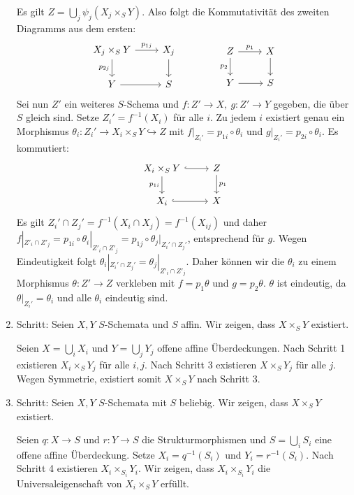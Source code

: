 \documentclass[11pt,b5paper,openany]{memoir}
\begin{document}
\begin{enumerate}
Es gilt $Z=\bigcup_j\psi_j(X_j\times_SY)$. Also folgt die Kommutativität des zweiten Diagramms aus dem ersten:
\[\begin{tikzcd}
X_j\times_S Y\ar[r, "p_{1j}"]\ar[d, "p_{2j}"'] & X_j\ar[d]\\
Y\ar[r] & S
\end{tikzcd}\qquad\qquad \begin{tikzcd}
Z\ar[d, "p_2"']\ar[r, "p_1"] & X\ar[d]\\
Y\ar[r] & S
\end{tikzcd}\]
Sei nun $Z'$ ein weiteres $S$-Schema und $f:Z'\to X,\ g:Z'\to Y$ gegeben, die über $S$ gleich sind. Setze $Z_i'=f^{-1}(X_i)$ für alle $i$. Zu jedem $i$ existiert genau ein Morphismus ${\theta}_i:Z_i'\to X_i\times_SY\hookrightarrow Z$ mit $f|_{Z_i'}=p_{1i}\circ{\theta}_i$ und $g|_{Z_i'}=p_{2i}\circ{\theta}_i$. Es kommutiert:
\[\begin{tikzcd}
X_i\times_SY\ar[r, hook]\ar[d, "p_{1i}"'] & Z\ar[d, "p_1"]\\
X_i\ar[r, hook] & X
\end{tikzcd} \]
Es gilt $Z_i'\cap Z_j'=f^{-1}(X_i\cap X_j)=f^{-1}(X_{ij})$ und daher $f|_{Z'_i\cap Z'_j}=p_{1i}\circ\theta_i|_{Z'_i\cap Z'_j}=p_{1j}\circ\theta_j|_{Z_i'\cap Z_j'}$, entsprechend für $g$. Wegen Eindeutigkeit folgt $\theta_i|_{Z_i'\cap Z_j'}=\theta_j|_{Z'_i\cap Z'_j}$. Daher können wir die $\theta_i$ zu einem Morphismus $\theta:Z'\to Z$ verkleben mit $f=p_1\theta$ und $g=p_2\theta$. $\theta$ ist eindeutig, da $\theta|_{Z_i'}=\theta_i$ und alle $\theta_i$ eindeutig sind.
\item Schritt: Seien $X,Y$ $S$-Schemata und $S$ affin. Wir zeigen, dass $X\times_SY$ existiert.

Seien $X=\bigcup_iX_i$ und $Y=\bigcup_jY_j$ offene affine Überdeckungen. Nach Schritt 1 existieren $X_i\times_S Y_j$ für alle $i,j$. Nach Schritt 3 existieren $X\times_SY_j$ für alle $j$. Wegen Symmetrie, existiert somit $ X\times_SY$ nach Schritt 3.
\item Schritt: Seien $X,Y$ $S$-Schemata mit $S$ beliebig. Wir zeigen, dass $X\times_SY$ existiert.

Seien $q:X\to S$ und $r:Y\to S$ die Strukturmorphismen und $S=\bigcup_iS_i$ eine offene affine Überdeckung. Setze $X_i=q^{-1}(S_i)$ und $Y_i=r^{-1}(S_i)$. Nach Schritt 4 existieren $X_i\times_{S_i}Y_i$. Wir zeigen, dass $X_i\times_{S_i}Y_i$ die Universaleigenschaft von $X_i\times_SY$ erfüllt.


\end{enumerate}
\end{document}

